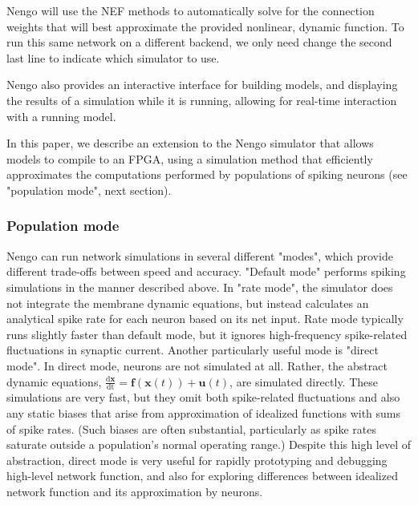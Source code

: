 \documentclass[english]{article}
\begin{document}
Nengo will use the NEF methods to automatically solve for the connection weights that will
best approximate the provided nonlinear, dynamic function.  To run this same network on a different backend, we only need change the second last line to indicate which simulator to use.

Nengo also provides an interactive interface for building models, and displaying the results of a simulation while it is running, allowing for real-time interaction
with a running model.

In this paper, we describe an extension to the Nengo simulator that allows models to compile to an FPGA, using a simulation method that efficiently approximates the computations performed by populations of spiking neurons (see "population mode", next section).

\subsubsection{Population mode}

Nengo can run network simulations in several different "modes", which provide different trade-offs between speed and accuracy. "Default mode" performs spiking simulations in the manner described above. In "rate mode", the simulator does not integrate the membrane dynamic equations, but instead calculates an analytical spike rate for each neuron based on its net input. Rate mode typically runs slightly faster than default mode, but it ignores high-frequency spike-related fluctuations in synaptic current. 
Another particularly useful mode is "direct mode". In direct mode, neurons are not simulated at all. Rather, the abstract dynamic equations, \textbf{$\mathbf{\frac{\mathrm{d}x}{\mathrm{dt}}=}\mathbf{f}(\mathbf{x}(t))+\mathbf{u}(t)$}, are simulated directly. These simulations are very fast, but they omit both spike-related fluctuations and also any static biases that arise from approximation of idealized functions with sums of spike rates. (Such biases are often substantial, particularly as spike rates saturate outside a population's normal operating range.) Despite this high level of abstraction, direct mode is very useful for rapidly prototyping and debugging high-level network function, and also for exploring differences between idealized network function and its approximation by neurons. 
\end{document}
